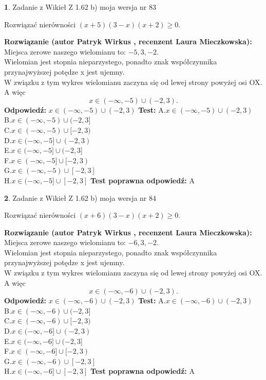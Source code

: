 \documentclass[12pt, a4paper]{article}
\theoremstyle{definition} %
\newtheorem{zad}{}
\newcommand{\zadStart}[1]{\begin{zad}#1\newline}
\newcommand{\zadStop}{\end{zad}}
\newcommand{\rozwStart}[2]{\noindent \textbf{Rozwiązanie (autor #1 , recenzent #2): }\newline}
\newcommand{\rozwStop}{\newline}
\newcommand{\odpStart}{\noindent \textbf{Odpowiedź:}\newline}
\newcommand{\odpStop}{\newline}
\newcommand{\testStart}{\noindent \textbf{Test:}\newline}
\newcommand{\testStop}{\newline}
\newcommand{\kluczStart}{\noindent \textbf{Test poprawna odpowiedź:}\newline}
\newcommand{\kluczStop}{\newline}
\begin{document}
\zadStart{Zadanie z Wikieł Z 1.62 b) moja wersja nr 83}

Rozwiązać nierówności $(x+5)(3-x)(x+2)\ge0$.
\zadStop
\rozwStart{Patryk Wirkus}{Laura Mieczkowska}
Miejsca zerowe naszego wielomianu to: $-5, 3, -2$.\\
Wielomian jest stopnia nieparzystego, ponadto znak współczynnika przy\linebreak najwyższej potędze x jest ujemny.\\ W związku z tym wykres wielomianu zaczyna się od lewej strony powyżej osi OX. A więc $$x \in (-\infty,-5) \cup (-2,3).$$
\rozwStop
\odpStart
$x \in (-\infty,-5) \cup (-2,3)$
\odpStop
\testStart
A.$x \in (-\infty,-5) \cup (-2,3)$\\
B.$x \in (-\infty,-5) \cup (-2,3]$\\
C.$x \in (-\infty,-5) \cup [-2,3)$\\
D.$x \in (-\infty,-5] \cup (-2,3)$\\
E.$x \in (-\infty,-5] \cup (-2,3]$\\
F.$x \in (-\infty,-5] \cup [-2,3)$\\
G.$x \in (-\infty,-5) \cup [-2,3]$\\
H.$x \in (-\infty,-5] \cup [-2,3]$
\testStop
\kluczStart
A
\kluczStop



\zadStart{Zadanie z Wikieł Z 1.62 b) moja wersja nr 84}

Rozwiązać nierówności $(x+6)(3-x)(x+2)\ge0$.
\zadStop
\rozwStart{Patryk Wirkus}{Laura Mieczkowska}
Miejsca zerowe naszego wielomianu to: $-6, 3, -2$.\\
Wielomian jest stopnia nieparzystego, ponadto znak współczynnika przy\linebreak najwyższej potędze x jest ujemny.\\ W związku z tym wykres wielomianu zaczyna się od lewej strony powyżej osi OX. A więc $$x \in (-\infty,-6) \cup (-2,3).$$
\rozwStop
\odpStart
$x \in (-\infty,-6) \cup (-2,3)$
\odpStop
\testStart
A.$x \in (-\infty,-6) \cup (-2,3)$\\
B.$x \in (-\infty,-6) \cup (-2,3]$\\
C.$x \in (-\infty,-6) \cup [-2,3)$\\
D.$x \in (-\infty,-6] \cup (-2,3)$\\
E.$x \in (-\infty,-6] \cup (-2,3]$\\
F.$x \in (-\infty,-6] \cup [-2,3)$\\
G.$x \in (-\infty,-6) \cup [-2,3]$\\
H.$x \in (-\infty,-6] \cup [-2,3]$
\testStop
\kluczStart
A
\kluczStop
\end{document}
